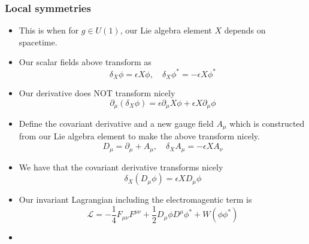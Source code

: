 \subsubsection*{Local symmetries}
\begin{itemize}
	\item This is when for $ g \in U ( 1 ) $, 
		our Lie algebra element  $ X $ depends 
		on spacetime. 
	\item Our scalar fields above transform as 
		\[
		 \delta _ X \phi  = \epsilon X \phi , \quad 
		 \delta _ X \phi ^  *  = - \epsilon X \phi ^ * 
		\] 
	\item Our derivative does NOT transform nicely 
		\[
			\partial  _ \mu \left( \delta _ X \phi   \right)  = 
			\epsilon \partial  _ \mu X \phi + \epsilon X \partial  _ \mu \phi 
		\] 
	\item Define the covariant derivative and a new gauge 
		field $A _ \mu $ which 
		is constructed from our Lie algebra element to make the above transform nicely. 
		\[
		 D_ \mu   = \partial  _ \mu  +A _ \mu , \quad 
		 \delta _ X A_ \mu   =  - \epsilon X A _ \nu 
		\] 
	\item We have that the covariant derivative 
		transforms nicely 
		\[
		 \delta _ X \left(  D _ \mu \phi  \right)   = 
		 \epsilon   X  D _ \mu  \phi 
		\] 
	\item Our invariant Lagrangian including the 
		electromagentic term is 
	\[
	 \mathcal{ L } =  -\frac{1}{4 } F _{ \mu \nu } F ^{ \mu\nu }
	  + \frac{1}{2 } D_ \mu \phi D ^{ \mu } \phi ^ * 
	  + W \left(  \phi \phi ^ *  \right) 
	\] 
\item 
\end{itemize}
\pagebreak 
